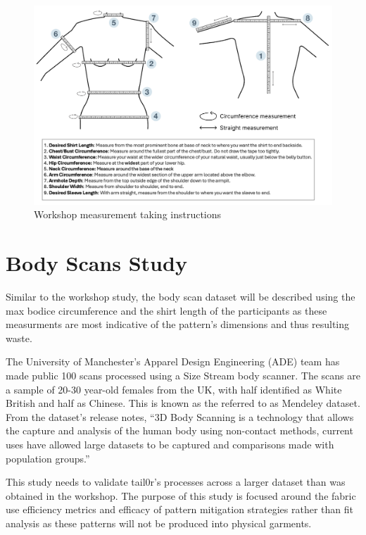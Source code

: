 \begin{figure} [htb]
    \centering
    \includegraphics[width = \textwidth]{Images/workshopmeasure.png}
    \caption{Workshop measurement taking instructions}
    \label{fig:workshopmeasure}
\end{figure}


\section{Body Scans Study}
Similar to the workshop study, the body scan dataset will be described using the max bodice circumference and the shirt length of the participants as these measurments are most indicative of the pattern's dimensions and thus resulting waste.


The University of Manchester's Apparel Design Engineering (ADE) team has made public 100 scans processed using a Size Stream body scanner. The scans are a sample of 20-30 year-old females from the UK, with half identified as White British and half as Chinese. This is known as the referred to as Mendeley dataset. From the dataset's release notes, “3D Body Scanning is a technology that allows the capture and analysis of the human body using non-contact methods, current uses have allowed large datasets to be captured and comparisons made with population groups.”

This study needs to validate tail0r's processes across a larger dataset than was obtained in the workshop. The purpose of this study is focused around the fabric use efficiency metrics and efficacy of pattern mitigation strategies rather than fit analysis as these patterns will not be produced into physical garments.

